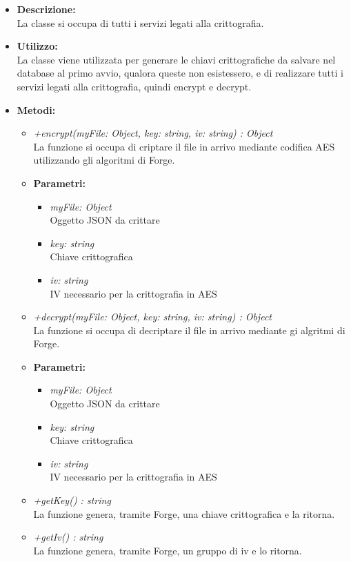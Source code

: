         \begin{itemize}
          \item \textbf{Descrizione: }\\
          La classe si occupa di tutti i servizi legati alla crittografia.
          \item \textbf{Utilizzo: }\\
          La classe viene utilizzata per generare le chiavi crittografiche da salvare nel database al primo avvio, qualora queste non esistessero, e di realizzare tutti i servizi legati alla crittografia, quindi encrypt e decrypt.
          \item \textbf{Metodi: }\\
            \begin{itemize}
            \item \emph{+encrypt(myFile: Object, key: string, iv: string) : Object}\\
            La funzione si occupa di criptare il file in arrivo mediante codifica AES utilizzando gli algoritmi di Forge.
            \item \textbf{Parametri: }\\
            \begin{itemize}
              \item \emph{myFile: Object}\\
              Oggetto JSON da crittare
              \item \emph{key: string}\\
              Chiave crittografica
              \item \emph{iv: string}\\
              IV necessario per la crittografia in AES
            \end{itemize}
            \item \emph{+decrypt(myFile: Object, key: string, iv: string) : Object}\\
            La funzione si occupa di decriptare il file in arrivo mediante gi algritmi di Forge.
            \item \textbf{Parametri: }\\
            \begin{itemize}
              \item \emph{myFile: Object}\\
              Oggetto JSON da crittare
              \item \emph{key: string}\\
              Chiave crittografica
              \item \emph{iv: string}\\
              IV necessario per la crittografia in AES
            \end{itemize}
             \item \emph{+getKey() : string}\\
             La funzione genera, tramite Forge, una chiave crittografica e la ritorna.
             \item \emph{+getIv() : string}\\
             La funzione genera, tramite Forge, un gruppo di iv e lo ritorna.
          \end{itemize}
        \end{itemize}
